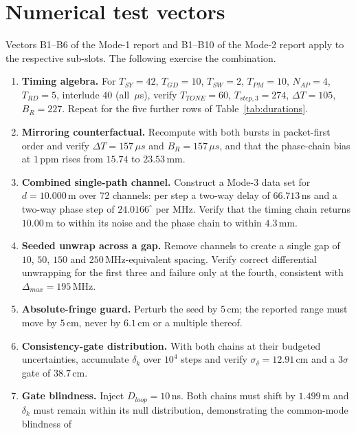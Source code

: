 \documentclass[11pt,a4paper]{article}
\newcommand{\us}{\,\ensuremath{\upmu}s}
\newcommand{\Tsy}{T_{SY}}
\newcommand{\Tgd}{T_{GD}}
\newcommand{\Ttone}{T_{TONE}}
\newcommand{\Tsw}{T_{SW}}
\newcommand{\Tpm}{T_{PM}}
\newcommand{\Trd}{T_{RD}}
\newcommand{\Nap}{N_{AP}}
\providecommand{\upmu}{\mu}
\begin{document}
\section{Numerical test vectors}

Vectors B1--B6 of the Mode-1 report and B1--B10 of the Mode-2 report apply to the respective
sub-slots. The following exercise the combination.

\begin{enumerate}[label=\textbf{C\arabic*.},leftmargin=2.6em,itemsep=2pt]
  \item \textbf{Timing algebra.} For $\Tsy=42$, $\Tgd=10$, $\Tsw=2$, $\Tpm=10$, $\Nap=4$, $\Trd=5$,
    interlude $40$ (all \us), verify $\Ttone=60$, $T_{step,3}=274$, $\Delta T=105$, $B_R=227$. Repeat
    for the five further rows of Table~\ref{tab:durations}.
  \item \textbf{Mirroring counterfactual.} Recompute with both bursts in packet-first order and
    verify $\Delta T=157\us$ and $B_R=157\us$, and that the phase-chain bias at $1$\,ppm rises from
    $15.74$ to $23.53$\,mm.
  \item \textbf{Combined single-path channel.} Construct a Mode-3 data set for $d=10.000$\,m over 72
    channels: per step a two-way delay of $66.713$\,ns and a two-way phase step of $24.0166^{\circ}$
    per MHz. Verify that the timing chain returns $10.00$\,m to within its noise and the phase chain
    to within $4.3$\,mm.
  \item \textbf{Seeded unwrap across a gap.} Remove channels to create a single gap of $10$, $50$,
    $150$ and $250$\,MHz-equivalent spacing. Verify correct differential unwrapping for the first
    three and failure only at the fourth, consistent with $\Delta_{max}=195$\,MHz.
  \item \textbf{Absolute-fringe guard.} Perturb the seed by $5$\,cm; the reported range must move by
    $5$\,cm, never by $6.1$\,cm or a multiple thereof.
  \item \textbf{Consistency-gate distribution.} With both chains at their budgeted uncertainties,
    accumulate $\delta_k$ over $10^4$ steps and verify $\sigma_\delta = 12.91$\,cm and a $3\sigma$
    gate of $38.7$\,cm.
  \item \textbf{Gate blindness.} Inject $D_{loop}=10$\,ns. Both chains must shift by $1.499$\,m and
    $\delta_k$ must remain within its null distribution, demonstrating the common-mode blindness of

\end{enumerate}
\end{document}
